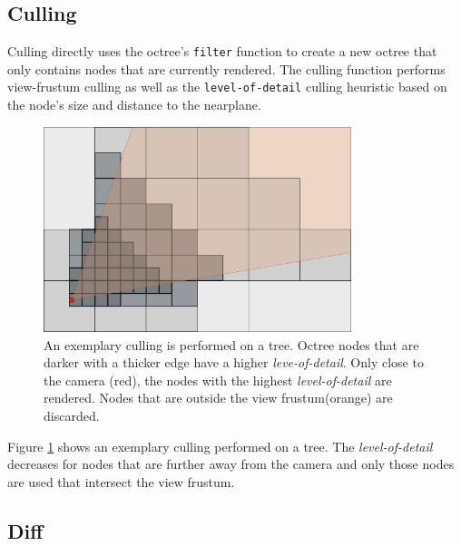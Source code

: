 \subsection{Culling}

Culling directly uses the octree's \verb|filter| function to create a new octree that only contains nodes that are currently rendered. The culling function performs view-frustum culling as well as the \verb|level-of-detail| culling heuristic based on the node's size and distance to the nearplane. 


\begin{figure}
    \centering
    \includegraphics[width=0.8\textwidth]{Implementation/octreeCulling.png}
    \caption{An exemplary culling is performed on a tree. Octree nodes that are darker with a thicker edge have a higher \textit{leve-of-detail}. Only close to the camera (red), the nodes with the highest \textit{level-of-detail} are rendered. Nodes that are outside the view frustum(orange) are discarded. }
    \label{fig:octreeCulling}
\end{figure}

Figure \ref{fig:octreeCulling} shows an exemplary culling performed on a tree. The \textit{level-of-detail} decreases for nodes that are further away from the camera and only those nodes are used that intersect the view frustum. 

\subsection{Diff}

